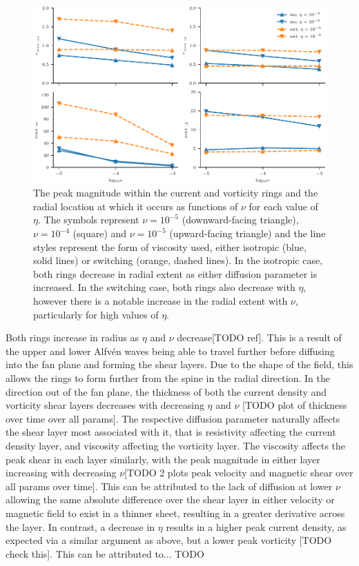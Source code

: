 \begin{figure}[h]
  \centering
  \includegraphics[width=1.0\linewidth]{param_study/peak_mag_and_loc.pdf}
  \caption{The peak magnitude within the current and vorticity rings and the radial location at which it occurs as functions of $\nu$ for each value of $\eta$. The symbols represent $\nu=10^{-5}$ (downward-facing triangle), $\nu=10^{-4}$ (square) and $\nu=10^{-5}$ (upward-facing triangle) and the line styles represent the form of viscosity used, either isotropic (blue, solid lines) or switching (orange, dashed lines). In the isotropic case, both rings decrease in radial extent as either diffusion parameter is increased. In the switching case, both rings also decrease with $\eta$, however there is a notable increase in the radial extent with $\nu$, particularly for high values of $\eta$.}%
  \label{fig:param_study_peak_mag_and_loc}
\end{figure}

Both rings increase in radius as $\eta$ and $\nu$ decrease[TODO ref]. This is a result of the upper and lower Alfv\'en waves being able to travel further before diffusing into the fan plane and forming the shear layers. Due to the shape of the field, this allows the rings to form further from the spine in the radial direction. In the direction out of the fan plane, the thickness of both the current density and vorticity shear layers decreases with decreasing $\eta$ and $\nu$ [TODO plot of thickness over time over all params]. The respective diffusion parameter naturally affects the shear layer most associated with it, that is resistivity affecting the current density layer, and viscosity affecting the vorticity layer. The viscosity affects the peak shear in each layer similarly, with the peak magnitude in either layer increasing with decreasing $\nu$[TODO 2 plots peak velocity and magnetic shear over all params over time]. This can be attributed to the lack of diffusion at lower $\nu$ allowing the same absolute difference over the shear layer in either velocity or magnetic field to exist in a thinner sheet, resulting in a greater derivative across the layer. In contrast, a decrease in $\eta$ results in a higher peak current density, as expected via a similar argument as above, but a lower peak vorticity [TODO check this]. This can be attributed to... TODO

